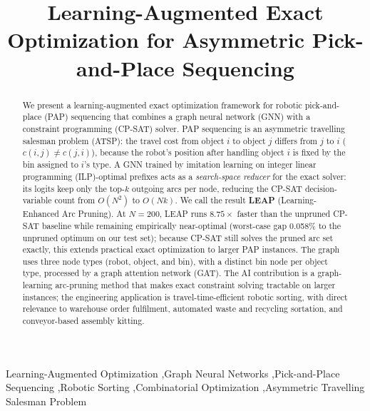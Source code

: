 \documentclass[review,times]{elsarticle}
\begin{document}
\begin{frontmatter}

\title{Learning-Augmented Exact Optimization for Asymmetric Pick-and-Place Sequencing}


\begin{abstract}
We present a learning-augmented exact optimization framework for robotic pick-and-place (PAP) sequencing that combines a graph neural network (GNN) with a constraint programming (CP-SAT) solver. PAP sequencing is an asymmetric travelling salesman problem (ATSP): the travel cost from object $i$ to object $j$ differs from $j$ to $i$ ($c(i,j)\neq c(j,i)$), because the robot's position after handling object $i$ is fixed by the bin assigned to $i$'s type. A GNN trained by imitation learning on integer linear programming (ILP)-optimal prefixes acts as a \emph{search-space reducer} for the exact solver: its logits keep only the top-$k$ outgoing arcs per node, reducing the CP-SAT decision-variable count from $O(N^2)$ to $O(Nk)$. We call the result \textbf{LEAP} (Learning-Enhanced Arc Pruning). At $N{=}200$, LEAP runs $8.75\times$ faster than the unpruned CP-SAT baseline while remaining empirically near-optimal (worst-case gap 0.058\% to the unpruned optimum on our test set); because CP-SAT still solves the pruned arc set exactly, this extends practical exact optimization to larger PAP instances. The graph uses three node types (robot, object, and bin), with a distinct bin node per object type, processed by a graph attention network (GAT). The AI contribution is a graph-learning arc-pruning method that makes exact constraint solving tractable on larger instances; the engineering application is travel-time-efficient robotic sorting, with direct relevance to warehouse order fulfilment, automated waste and recycling sortation, and conveyor-based assembly kitting.
\end{abstract}

\begin{keyword}
Learning-Augmented Optimization \sep Graph Neural Networks \sep Pick-and-Place Sequencing \sep Robotic Sorting \sep Combinatorial Optimization \sep Asymmetric Travelling Salesman Problem
\end{keyword}

\end{frontmatter}

\end{document}
